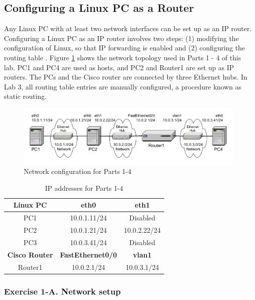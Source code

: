 \newpage
\subsection{Configuring a Linux PC as a Router}
Any Linux PC with at least two network interfaces can be set up as an IP router. Configuring a Linux PC as an IP router involves two steps: (1) modifying the configuration of Linux, so that IP forwarding is enabled and (2) configuring the routing table . Figure \ref{fig:lab3-network1} shows the network topology used in Parts 1 - 4 of this lab. PC1 and PC4 are used as hosts, and PC2 and Router1 are set up as IP routers. The PCs and the Cisco router are connected by three Ethernet hubs. In Lab 3, all routing table entries are manually configured, a procedure known as static routing.

\begin{figure}[h!t]
	\centering
	\includegraphics[width=\linewidth]{graphics/lab3-network1-updated.pdf}	
	\caption{Network configuration for Parts 1-4}
	\label{fig:lab3-network1}
\end{figure}

\begin{table}[h!t]
	\centering
	\begin{tabular}{| c | c | c |}	
		\hline
		\textbf{Linux PC} & \textbf{eth0} & \textbf{eth1} \\ \hline
		PC1 & 10.0.1.11/24 & Disabled \\ 
		PC2 & 10.0.1.21/24 & 10.0.2.22/24 \\
		PC3 & 10.0.3.41/24 & Disabled \\ \hline
		\textbf{Cisco Router} & \textbf{FastEthernet0/0} & \textbf{vlan1} \\ \hline
		Router1 & 10.0.2.1/24 & 10.0.3.1/24 \\ \hline
	\end{tabular}
	\caption{IP addresses for Parts 1-4}
	\label{tab:lab3-network1}
\end{table}

\subsubsection*{Exercise 1-A. Network setup}

